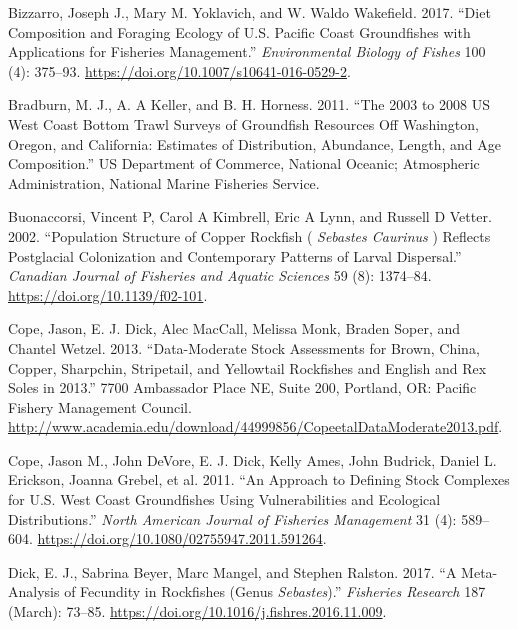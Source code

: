 \documentclass[11pt,
  english,
  a4paper,
]{article}
\begin{document}
\hypertarget{refs}{}
\begin{cslreferences}
\leavevmode\hypertarget{ref-bizzarro_diet_2017-1}{}%
Bizzarro, Joseph J., Mary M. Yoklavich, and W. Waldo Wakefield. 2017. ``Diet Composition and Foraging Ecology of U.S. Pacific Coast Groundfishes with Applications for Fisheries Management.'' \emph{Environmental Biology of Fishes} 100 (4): 375--93. \url{https://doi.org/10.1007/s10641-016-0529-2}.

\leavevmode\hypertarget{ref-bradburn_2003_2011}{}%
Bradburn, M. J., A. A Keller, and B. H. Horness. 2011. ``The 2003 to 2008 US West Coast Bottom Trawl Surveys of Groundfish Resources Off Washington, Oregon, and California: Estimates of Distribution, Abundance, Length, and Age Composition.'' US Department of Commerce, National Oceanic; Atmospheric Administration, National Marine Fisheries Service.

\leavevmode\hypertarget{ref-buonaccorsi_population_2002}{}%
Buonaccorsi, Vincent P, Carol A Kimbrell, Eric A Lynn, and Russell D Vetter. 2002. ``Population Structure of Copper Rockfish ( \emph{Sebastes Caurinus} ) Reflects Postglacial Colonization and Contemporary Patterns of Larval Dispersal.'' \emph{Canadian Journal of Fisheries and Aquatic Sciences} 59 (8): 1374--84. \url{https://doi.org/10.1139/f02-101}.

\leavevmode\hypertarget{ref-cope_data-moderate_2013}{}%
Cope, Jason, E. J. Dick, Alec MacCall, Melissa Monk, Braden Soper, and Chantel Wetzel. 2013. ``Data-Moderate Stock Assessments for Brown, China, Copper, Sharpchin, Stripetail, and Yellowtail Rockfishes and English and Rex Soles in 2013.'' 7700 Ambassador Place NE, Suite 200, Portland, OR: Pacific Fishery Management Council. \url{http://www.academia.edu/download/44999856/CopeetalDataModerate2013.pdf}.

\leavevmode\hypertarget{ref-cope_approach_2011}{}%
Cope, Jason M., John DeVore, E. J. Dick, Kelly Ames, John Budrick, Daniel L. Erickson, Joanna Grebel, et al. 2011. ``An Approach to Defining Stock Complexes for U.S. West Coast Groundfishes Using Vulnerabilities and Ecological Distributions.'' \emph{North American Journal of Fisheries Management} 31 (4): 589--604. \url{https://doi.org/10.1080/02755947.2011.591264}.

\leavevmode\hypertarget{ref-dick_meta-analysis_2017}{}%
Dick, E. J., Sabrina Beyer, Marc Mangel, and Stephen Ralston. 2017. ``A Meta-Analysis of Fecundity in Rockfishes (Genus \emph{Sebastes}).'' \emph{Fisheries Research} 187 (March): 73--85. \url{https://doi.org/10.1016/j.fishres.2016.11.009}.


\end{cslreferences}
\end{document}
